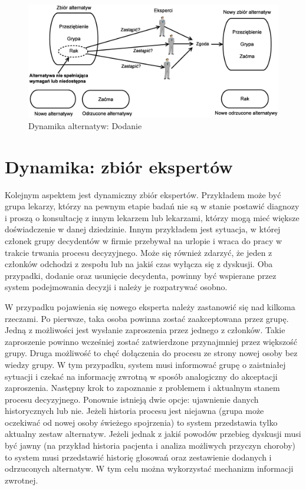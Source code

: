 \begin{figure}[ht]
  \includegraphics[width=\linewidth]
  	{chapters/modelinggroupdecision/usuniecie_alternatyw}
  \caption{Dynamika alternatyw: Dodanie}
  \label{fig:dynamika_alternatyw_dodanie}
\end{figure}

\section{Dynamika: zbiór ekspertów}
Kolejnym aspektem jest dynamiczny zbiór ekspertów. Przykładem może być grupa
lekarzy, którzy na pewnym etapie badań nie są w stanie postawić diagnozy i
proszą o konsultację z innym lekarzem lub lekarzami, którzy mogą mieć większe
doświadczenie w danej dziedzinie. Innym przykładem jest sytuacja, w której
członek grupy decydentów w firmie przebywał na urlopie i wraca do pracy w
trakcie trwania procesu decyzyjnego. Może się również zdarzyć, że jeden z
członków odchodzi z zespołu lub na jakiś czas wyłącza się z dyskusji. Oba
przypadki, dodanie oraz usunięcie decydenta, powinny być wspierane przez system
podejmowania decyzji i należy je rozpatrywać osobno. 

W przypadku pojawienia się nowego eksperta należy zastanowić się nad kilkoma
rzeczami. Po pierwsze, taka osoba powinna zostać zaakceptowana przez grupę.
Jedną z możliwości jest wysłanie zaproszenia przez jednego z członków. Takie
zaproszenie powinno wcześniej zostać zatwierdzone przynajmniej przez większość
grupy. Druga możliwość to chęć dołączenia do procesu ze strony nowej osoby bez
wiedzy grupy. W tym przypadku, system musi informować grupę o zaistniałej
sytuacji i czekać na informację zwrotną w sposób analogiczny do akceptacji
zaproszenia. Następny krok to zapoznanie z problemem i aktualnym stanem procesu
decyzyjnego. Ponownie istnieją dwie opcje: ujawnienie danych historycznych lub
nie. Jeżeli historia procesu jest niejawna (grupa może oczekiwać od nowej osoby
świeżego spojrzenia) to system przedstawia tylko aktualny zestaw alternatyw.
Jeżeli jednak z jakiś powodów przebieg dyskusji musi być jawny (na przykład
historia pacjenta i analiza możliwych przyczyn choroby) to system musi
przedstawić historię głosowań oraz zestawienie dodanych i odrzuconych
alternatyw. W tym celu można wykorzystać mechanizm informacji zwrotnej.

